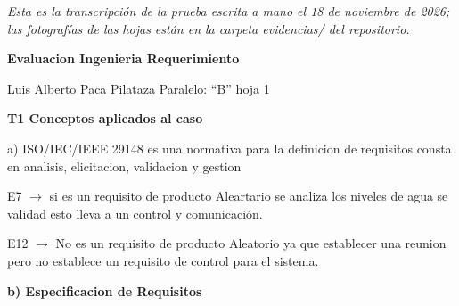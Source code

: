 \documentclass[11pt,a4paper]{article}
\begin{document}
\noindent\textit{Esta es la transcripción de la prueba escrita a mano el 18 de noviembre de 2026; las fotografías de las hojas están en la carpeta evidencias/ del repositorio.}

\vspace{0.5cm}

\begin{center}
    \textbf{Evaluacion Ingenieria Requerimiento}
\end{center}

\noindent Luis Alberto Paca Pilataza \hfill Paralelo: ``B'' \hfill hoja 1

\vspace{0.4cm}

\noindent\textbf{T1 Conceptos aplicados al caso}

\vspace{0.2cm}

\noindent a) ISO/IEC/IEEE 29148 es una normativa para la definicion de requisitos consta en analisis, elicitacion, validacion y gestion

\vspace{0.2cm}

\noindent E7 $\rightarrow$ si es un requisito de producto Aleartario se analiza los niveles de agua se validad esto lleva a un control y comunicación.

\vspace{0.2cm}

\noindent E12 $\rightarrow$ No es un requisito de producto Aleatorio ya que establecer una reunion pero no establece un requisito de control para el sistema.

\vspace{0.4cm}

\noindent\textbf{b) Especificacion de Requisitos}

\vspace{0.2cm}
\end{document}
